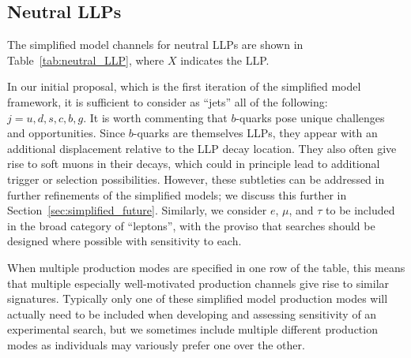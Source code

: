 \subsection{Neutral LLPs}\label{sec:proposal_neutralLLP}

The simplified model channels for neutral LLPs are shown in Table~\ref{tab:neutral_LLP}, where $X$ indicates the LLP.

In our initial proposal, which is the first iteration of the simplified model framework, it is sufficient to consider as ``jets'' all of the following:~$j=u,d,s,c,b,g$.
It is worth commenting that $b$-quarks pose unique challenges and opportunities.
Since $b$-quarks are themselves LLPs, they appear with an additional displacement relative to the LLP decay location.
They also often give rise to soft muons in their decays, which could in principle lead to additional trigger or selection possibilities.
However, these subtleties can be addressed in further refinements of the simplified models; we discuss this further in Section~\ref{sec:simplified_future}.
Similarly, we consider $e$, $\mu$, and $\tau$ to be included in the broad category of ``leptons'', with the proviso that
searches should be designed where possible with sensitivity to each.
 
When multiple production modes are specified in one row of the table, this means that multiple especially well-motivated production channels give rise to similar signatures.
Typically only one of these simplified model production modes will actually need to be included when developing and assessing sensitivity of an experimental search, but we sometimes include multiple different production modes as individuals may variously prefer one over the other.

